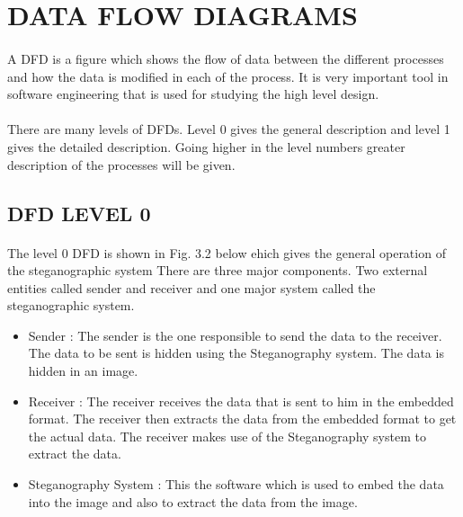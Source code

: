 \documentclass[12pt]{report}
\begin{document}
\section{DATA FLOW DIAGRAMS}
\paragraph{}A DFD is a figure which shows the flow of data between the different processes and how the data is modified in each of the process. It is very important tool in software engineering that is used for studying the high level design.\\
\paragraph{}There are many levels of DFDs. Level 0 gives the general description and level 1 gives the detailed description. Going higher in the level numbers greater description of the processes will be given.
\pagebreak
\subsection{DFD LEVEL 0}
\paragraph{}The level 0 DFD is shown in Fig. 3.2 below ehich gives the general operation of the steganographic system There are three major components. Two external entities called sender and receiver and one major system called the steganographic system.
\begin{itemize}
\item Sender : The sender is the one responsible to send the data to the receiver. The data to be sent is hidden using the Steganography system. The data is hidden in an image.
\item Receiver : The receiver receives the data that is sent to him in the embedded format. The receiver then extracts the data from the embedded format to get the actual data. The receiver makes use of the Steganography system to extract the data.
\item Steganography System : This the software which is used to embed the data into the image and also to extract the data from the image.
\end{itemize}
\pagebreak
\end{document}
